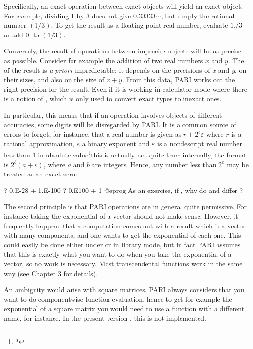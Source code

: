 Specifically, an exact operation between exact objects will yield an exact
object. For example, dividing 1 by 3 does not give $0.33333\cdots$, but
simply the rational number $(1/3)$. To get the result as a floating point
real number, evaluate $1./3$ or add $0.$ to $(1/3)$.

Conversely, the result of operations between imprecise objects will be as
precise as possible. Consider for example the addition of two real numbers
$x$ and $y$. The  of the result is \emph{a priori}
unpredictable; it depends on the precisions of $x$ and $y$, on their sizes,
and also on the size of $x+y$. From this data, PARI works out the right
precision for the result. Even if it is working in calculator mode 
where there is a notion of , which is only used to
convert exact types to inexact ones.

In particular, this means that if an operation involves objects of
different accuracies, some digits will be disregarded by PARI. It is a
common source of errors to forget, for instance, that a real number is
given as $r + 2^e \varepsilon$ where $r$ is a rational approximation, $e$ a
binary exponent and $\varepsilon$ is a nondescript real number less than 1 in
absolute value\footnote{*}{this is actually not quite true: internally, the
format is $2^b (a + \varepsilon)$, where $a$ and $b$ are integers}. Hence,
any number less than $2^e$ may be treated as an exact zero:

\bprog
? 0.E-28 + 1.E-100
? 0.E100 + 1
@eprog
\noindent As an exercise, if , why do  and
 differ ?

The second principle is that PARI operations are in general quite permissive.
For instance taking the exponential of a vector should not make sense.
However, it frequently happens that a computation comes out with a result
which is a vector with many components, and one wants to get the exponential
of each one. This could easily be done either under  or in library
mode, but in fact PARI assumes that this is exactly what you want to do when
you take the exponential of a vector, so no work is necessary. Most
transcendental functions work in the same way (see Chapter 3 for details).

An ambiguity would arise with square matrices. PARI always considers that you
want to do componentwise function evaluation, hence to get for example the
exponential of a square matrix you would need to use a function with a
different name,  for instance. In the present version \vers, this
is not implemented.

